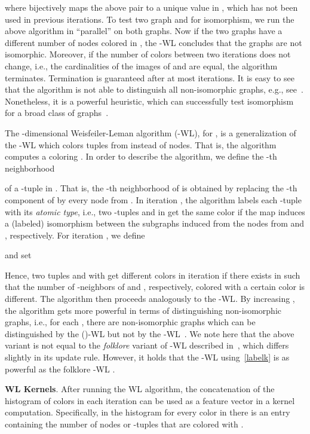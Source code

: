 \documentclass[letterpaper]{article}
\theoremstyle{definition}
\newcommand{\xhdr}[1]{{\noindent\bfseries #1}.}
\newcommand{\new}[1]{\emph{#1}}
\begin{document}
where  bijectively maps the above pair to a unique value in , which has not been used in previous iterations. To test two graph  and  for isomorphism, we run the above algorithm in ``parallel'' on both graphs. Now if the two graphs have a different number of nodes colored  in , the \textsc{-WL} concludes that the graphs are not isomorphic. Moreover, if the number of colors between two iterations does not change, i.e., the cardinalities of the images of  and  are equal, the algorithm terminates. Termination is guaranteed after at most  iterations. It is easy to see that the algorithm is not able to distinguish all non-isomorphic graphs, e.g., see~\cite{Cai+1992}. Nonetheless, it is a powerful heuristic, which can successfully test isomorphism for a broad class of graphs~\cite{Bab+1979}.


The -dimensional Weisfeiler-Leman algorithm (-WL), for , is a generalization of the -WL which colors tuples from  instead of nodes. That is, the algorithm computes a coloring . In order to describe the algorithm, we define the -th neighborhood

of a -tuple  in . That is, the -th neighborhood  of  is obtained by replacing the -th component of  by every node from . In iteration , the algorithm labels each -tuple with its \new{atomic type}, i.e., two -tuples  and  in  get the same color if the map  induces a (labeled) isomorphism between the subgraphs induced from the nodes from  and , respectively. For iteration , we define 

and set 


Hence, two tuples  and  with  get different colors in iteration  if there exists  in  such that the number of -neighbors of  and , respectively, colored with a certain color is different. 
The algorithm then proceeds analogously to the \textsc{-WL}. 
By increasing , the algorithm gets more powerful in terms of distinguishing non-isomorphic graphs, i.e., for each , there are non-isomorphic graphs which can be distinguished by the ()-WL but not by the -WL~\cite{Cai+1992}.
We note here that the above variant is not equal to the \emph{folklore} variant of -WL described in~\cite{Cai+1992}, which differs slightly in its update rule. 
However, it holds that the -WL using~\cref{labelk} is as powerful as the folklore -WL \cite{GroheO15}.

\xhdr{WL Kernels}
After running the WL algorithm, the concatenation of the histogram of colors in each iteration can be used as a feature vector in a kernel computation. 
Specifically, in the histogram for every color  in  there is an entry containing the number of nodes or -tuples that are colored with .
\end{document}
